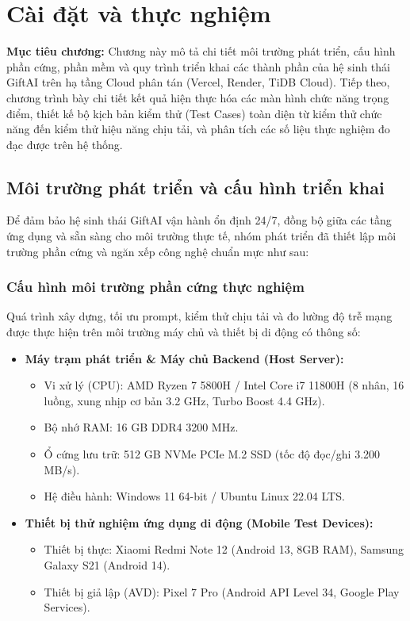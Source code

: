 
\chapter{Cài đặt và thực nghiệm}
\label{chap:chuong5}

\begin{infobox}
\textbf{Mục tiêu chương:}
Chương này mô tả chi tiết môi trường phát triển, cấu hình phần cứng, phần mềm và quy trình triển khai các thành phần của hệ sinh thái GiftAI trên hạ tầng Cloud phân tán (Vercel, Render, TiDB Cloud). Tiếp theo, chương trình bày chi tiết kết quả hiện thực hóa các màn hình chức năng trọng điểm, thiết kế bộ kịch bản kiểm thử (Test Cases) toàn diện từ kiểm thử chức năng đến kiểm thử hiệu năng chịu tải, và phân tích các số liệu thực nghiệm đo đạc được trên hệ thống.
\end{infobox}

\section{Môi trường phát triển và cấu hình triển khai}

Để đảm bảo hệ sinh thái GiftAI vận hành ổn định 24/7, đồng bộ giữa các tầng ứng dụng và sẵn sàng cho môi trường thực tế, nhóm phát triển đã thiết lập môi trường phần cứng và ngăn xếp công nghệ chuẩn mực như sau:

\subsection{Cấu hình môi trường phần cứng thực nghiệm}
Quá trình xây dựng, tối ưu prompt, kiểm thử chịu tải và đo lường độ trễ mạng được thực hiện trên môi trường máy chủ và thiết bị di động có thông số:
\begin{itemize}
    \item \textbf{Máy trạm phát triển \& Máy chủ Backend (Host Server):}
    \begin{itemize}
        \item Vi xử lý (CPU): AMD Ryzen 7 5800H / Intel Core i7 11800H (8 nhân, 16 luồng, xung nhịp cơ bản 3.2 GHz, Turbo Boost 4.4 GHz).
        \item Bộ nhớ RAM: 16 GB DDR4 3200 MHz.
        \item Ổ cứng lưu trữ: 512 GB NVMe PCIe M.2 SSD (tốc độ đọc/ghi 3.200 MB/s).
        \item Hệ điều hành: Windows 11 64-bit / Ubuntu Linux 22.04 LTS.
    \end{itemize}
    \item \textbf{Thiết bị thử nghiệm ứng dụng di động (Mobile Test Devices):}
    \begin{itemize}
        \item Thiết bị thực: Xiaomi Redmi Note 12 (Android 13, 8GB RAM), Samsung Galaxy S21 (Android 14).
        \item Thiết bị giả lập (AVD): Pixel 7 Pro (Android API Level 34, Google Play Services).
    \end{itemize}
\end{itemize}


